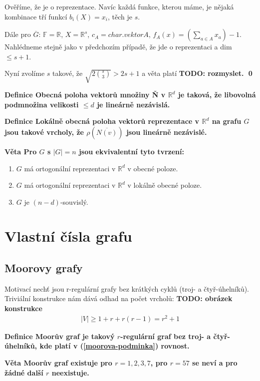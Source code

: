 \documentclass[a4paper,12pt,titlepage]{article}
\newcommand{\df}{\smallskip\noindent\bf Definice\rm{} }
\newcommand{\vt}{\smallskip\noindent\bf Věta\rm{} }
\newcommand{\Fr}{\mathbb{F}}
\newcommand{\R}{\mathbb{R}}
\newcommand{\todo}[1]{\bf TODO: \rm#1}
\begin{document}
Ověříme, že je o reprezentace. Navíc každá funkce, kterou máme, je nějaká kombinace tří funkcí $b_i(X) = x_i$, těch je $s$.

Dále pro $\overline G$: $\Fr = \R$, $X = \R^s$, $c_A = char. vektor A$, $f_A(x) = \left(\sum_{a\in A} x_a\right) -1$. Nahlédneme stejně jako v předchozím případě, že jde o reprezentaci a dim $\leq s+1$.

Nyní zvolíme $s$ takové, že $\sqrt{2\binom{s}{3}} > 2s + 1$ a věta platí \todo{rozmyslet}. \qed

\df Obecná poloha vektorů množiny \v N v  $\R^d$ je taková, že libovolná podmnožina velikosti $\leq d$ je lineárně nezávislá.

\df Lokálně obecná poloha vektorů reprezentace v $\R^d$ na grafu $G$ jsou takové vrcholy, že $\rho(\overline{N(v)})$ jsou lineárně nezávislé.

\vt Pro $G$ s $|G| = n$ jsou ekvivalentní tyto tvrzení:
\begin{enumerate}
	\item $G$ má ortogonální reprezentaci v $\R^d$ v obecné poloze.
	\item $G$ má ortogonální reprezentaci v $\R^d$ v lokálně obecné poloze.
	\item $G$ je $(n-d)$-souvislý.
\end{enumerate}


\section{Vlastní čísla grafu}
\subsection{Moorovy grafy}
Motivací nechť jsou r-regulární grafy bez krátkých cyklů (troj- a 
čtyř-úhelníků). Triviální konstrukce nám dává odhad na počet vrcholů:
\todo{obrázek konstrukce}
\begin{align}
\label{moorova-podminka}
	|V| \geq 1 + r + r(r-1) = r^2 +1
\end{align}

\df Moorův graf je takový $r$-regulární graf bez troj- a čtyř-úhelníků, kde 
platí v (\ref{moorova-podminka}) rovnost.

\vt Moorův graf existuje pro $r=1,2,3,7$, pro $r=57$ se neví a pro žádné další 
$r$ neexistuje.
\end{document}

